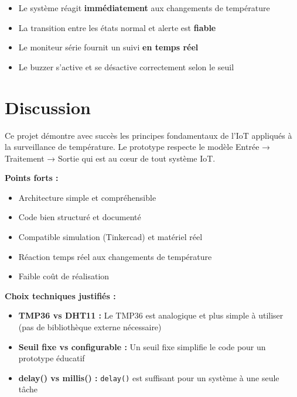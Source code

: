 \documentclass[12pt, a4paper]{article}
\begin{document}
\begin{itemize}
    \item Le système réagit \textbf{immédiatement} aux changements de température
    \item La transition entre les états normal et alerte est \textbf{fiable}
    \item Le moniteur série fournit un suivi \textbf{en temps réel}
    \item Le buzzer s'active et se désactive correctement selon le seuil
\end{itemize}

\section{Discussion}

Ce projet démontre avec succès les principes fondamentaux de l'IoT appliqués à la surveillance de température. Le prototype respecte le modèle Entrée → Traitement → Sortie qui est au cœur de tout système IoT.

\textbf{Points forts :}
\begin{itemize}
    \item Architecture simple et compréhensible
    \item Code bien structuré et documenté
    \item Compatible simulation (Tinkercad) et matériel réel
    \item Réaction temps réel aux changements de température
    \item Faible coût de réalisation
\end{itemize}

\textbf{Choix techniques justifiés :}
\begin{itemize}
    \item \textbf{TMP36 vs DHT11 :} Le TMP36 est analogique et plus simple à utiliser (pas de bibliothèque externe nécessaire)
    \item \textbf{Seuil fixe vs configurable :} Un seuil fixe simplifie le code pour un prototype éducatif
    \item \textbf{delay() vs millis() :} \texttt{delay()} est suffisant pour un système à une seule tâche
\end{itemize}

\end{document}
